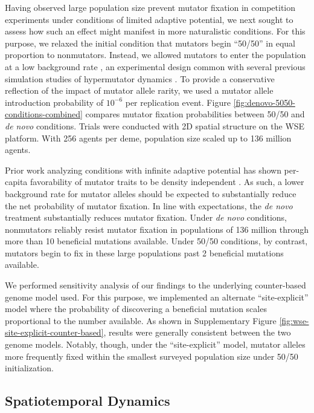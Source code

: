 Having observed large population size prevent mutator fixation in competition experiments under conditions of limited adaptive potential, we next sought to assess how such an effect might manifest in more naturalistic conditions.
For this purpose, we relaxed the initial condition that mutators begin ``50/50'' in equal proportion to nonmutators.
Instead, we allowed mutators to enter the population at a low background rate \citep{desai2011balance,johnson1999approach}, an experimental design common with several previous simulation studies of hypermutator dynamics \citep{wylie2009fixation,tenaillon1999mutators}.
To provide a conservative reflection of the impact of mutator allele rarity, we used a mutator allele introduction probability of $10^{-6}$ per replication event.
Figure \ref{fig:denovo-5050-conditions-combined} compares mutator fixation probabilities between 50/50 and \textit{de novo} conditions.
Trials were conducted with 2D spatial structure on the WSE platform.
With 256 agents per deme, population size scaled up to 136 million agents.

Prior work analyzing conditions with infinite adaptive potential has shown per-capita favorability of mutator traits to be density independent \citep{raynes2019selection}.
As such, a lower background rate for mutator alleles should be expected to substantially reduce the net probability of mutator fixation.
In line with expectations, the \textit{de novo} treatment substantially reduces mutator fixation.
Under \textit{de novo} conditions, nonmutators reliably resist mutator fixation in populations of 136 million through more than 10 beneficial mutations available.
Under 50/50 conditions, by contrast, mutators begin to fix in these large populations past 2 beneficial mutations available.

We performed sensitivity analysis of our findings to the underlying counter-based genome model used.
For this purpose, we implemented an alternate ``site-explicit'' model where the probability of discovering a beneficial mutation scales proportional to the number available.
As shown in Supplementary Figure \ref{fig:wse-site-explicit-counter-based}, results were generally consistent between the two genome models.
Notably, though, under the ``site-explicit'' model, mutator alleles more frequently fixed within the smallest surveyed population size under 50/50 initialization.

\subsection{Spatiotemporal Dynamics}
\label{sec:dynamics}

